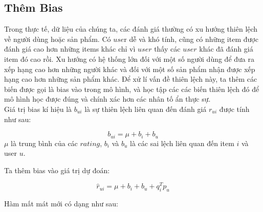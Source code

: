 \subsection{Thêm Bias}
Trong thực tế, dữ liệu của chúng ta, các đánh giá thường có xu hướng thiên lệch về người dùng hoặc sản phẩm. Có $use$r dễ và khó tính, cũng có những item được đánh giá cao hơn những items khác chỉ vì $user$ thấy các $user$ khác đã đánh giá item đó cao rồi. Xu hướng có hệ thống lớn đối với một số người dùng để đưa ra xếp hạng cao hơn những người khác và đối với một số sản phẩm nhận được xếp hạng cao hơn những sản phẩm khác. Để xử lí vấn đề thiên lệch này, ta thêm các biến được gọi là bias vào trong mô hình, và học tập các các biến thiên lệch đó để mô hình học được đúng và chính xác hơn các nhân tố ẩn thực sự.\\
Giá trị bias kí hiệu là $b_{ui}$ là sự thiên lệch liên quan đến đánh giá $r_{ui}$ được tính như sau:
\begin{center}
    \begin{equation}
        b_{ui} = \mu + b_i +b_u
    \end{equation}
    $\mu$ là trung bình của các $rating$, $b_i$ và $b_u$ là các sai lệch liên quan đến item $i$ và user $u$. 
\end{center}
Ta thêm bias vào giá trị dự đoán:
\begin{center}
    \begin{equation}
        \hat r_{ui} = \mu + b_i + b_u + q_i ^Tp_u
    \end{equation}
\end{center}
Hàm mất mát mới có dạng như sau:

